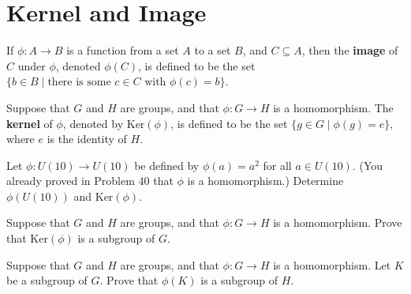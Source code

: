 \section{Kernel and Image}

\begin{definition}
If \(\phi : A \longrightarrow B \) is a function from a set \(A\) to a set \(B\), and \(C \subseteq A\), then the \textbf{image} of \(C\) under \(\phi\), denoted \(\phi(C)\), is defined to be the set \(\{b \in B \mid \mbox{there is some } c \in C \mbox{ with } \phi(c) = b \}\).
\end{definition}

\begin{definition}
Suppose that \(G\) and \(H\) are groups, and that \(\phi : G \longrightarrow H\) is a homomorphism. The \textbf{kernel} of \(\phi\), denoted by \(\mbox{Ker}( \phi )\), is defined to be the
set \(\{g \in G \mid \phi(g) = e \} \), where \(e\) is the identity of \(H\).
\begin{annotation}
\end{annotation}
\end{definition}

\begin{problem}
Let \(\phi : U(10) \longrightarrow U(10) \) be defined by \(\phi(a) = a^2\) for all \(a \in U(10)\). (You already proved in Problem 40 that \(\phi\) is a homomorphism.) Determine \(\phi(U(10))\) and \(\mbox{Ker}(\phi)\).
\end{problem}

\begin{problem}\label{prob:kernelsubgp}
Suppose that \(G\) and \(H\) are groups, and that \(\phi : G \longrightarrow H\) is a homomorphism. Prove that \(\mbox{Ker}(\phi)\) is a subgroup of \(G\).
\begin{annotation}
\end{annotation}
\end{problem}

\begin{problem}\label{prob:imagesubgp}
Suppose that \(G\) and \(H\) are groups, and that \(\phi : G \longrightarrow H\) is a homomorphism. Let \(K\) be a subgroup of \(G\). Prove that \(\phi(K)\) is a subgroup of \(H\).
\begin{annotation}
\end{annotation}
\end{problem}

